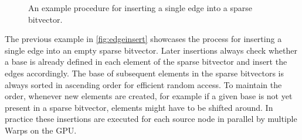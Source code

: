 \begin{figure}
\begin{center}
    \end{center}
    \caption{An example procedure for inserting a single edge into a sparse bitvector.}
    \label{fig:edgeinsert}
\end{figure}
The previous example in \autoref{fig:edgeinsert} showcases the process for inserting a single edge into an empty sparse bitvector.
Later insertions always check whether a base is already defined in each element of the sparse bitvector and insert the edges accordingly.
The base of subsequent elements in the sparse bitvectors is always sorted in ascending order for efficient random access. To maintain the order, whenever new elements are created, for example if a given base is not yet present in a sparse bitvector, elements might have to be shifted around.
In practice these insertions are executed for each source node in parallel by multiple Warps on the GPU.

